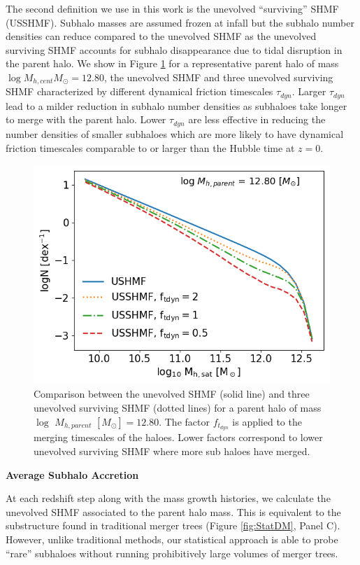 The second definition we use in this work is the unevolved ``surviving'' SHMF (USSHMF). Subhalo masses are assumed frozen at infall but the subhalo number densities can reduce compared to the unevolved SHMF as the unevolved surviving SHMF accounts for subhalo disappearance due to tidal disruption in the parent halo. We show in Figure \ref{fig:SHMF_clus} for a representative parent halo of mass $\log M_{h,cent} M_{\odot} = 12.80$, the unevolved SHMF and three unevolved surviving SHMF characterized by different dynamical friction timescales $\tau_{dyn}$. Larger $\tau_{dyn}$ lead to a milder reduction in subhalo number densities as subhaloes take longer to merge with the parent halo. Lower $\tau_{dyn}$ are less effective in reducing the number densities of smaller subhaloes which are more likely to have dynamical friction timescales comparable to or larger than the Hubble time at $z = 0$.
\begin{figure}[h!]
    \centering
    \includegraphics[width = \linewidth]{Figures/Chapter2/SHMF_OneCluster.png}
    \caption{Comparison between the unevolved SHMF (solid line) and three unevolved surviving SHMF  (dotted lines) for a parent halo of mass $\log$ $M_{h,parent}$ $[M_{\odot}] = 12.80$. The factor $f_{t_{dyn}}$ is applied to the merging timescales of the haloes. Lower factors correspond to lower unevolved surviving SHMF where more sub haloes have merged.}
    \label{fig:SHMF_clus}
\end{figure}

\textbf{Average Subhalo Accretion}

At each redshift step along with the mass growth histories, we calculate the unevolved SHMF associated to the parent halo mass. This is equivalent to the substructure found in traditional merger trees (Figure \ref{fig:StatDM}, Panel C). However, unlike traditional methods, our statistical approach is able to probe ``rare'' subhaloes without running prohibitively large volumes of merger trees.

